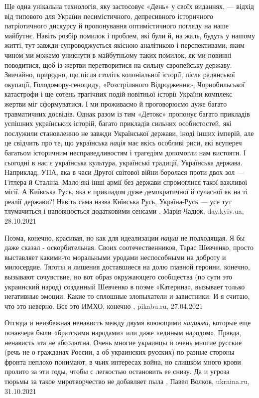 Ще одна унікальна технологія, яку застосовує «День» у своїх виданнях, — відхід
від типового для України песимістичного, депресивного історичного патріотичного
дискурсу й пропонування оптимістичного погляду на наше майбутнє. Навіть розбір
помилок і проблем, які були й, на жаль, будуть у нашому житті, тут завжди
супроводжується якісною аналітикою і перспективами, яким чином ми можемо
уникнути в майбутньому таких помилок, як ми повинні поводитися, щоб із жертви
перетворитися на сильну європейську державу. Звичайно, природно, що після
століть колоніальної історії, після радянської окупації, Голодомору-геноциду,
«Розстріляного Відродження», Чорнобильської катастрофи і ще сотень трагічних
подій новітньої історії України комплекс жертви міг сформуватися. І ми
проживаємо й проговорюємо дуже багато травматичних досвідів.  Однак разом із
тим «Детокс» пропонує багато прикладів успішних українських історій, багато
прикладів сильних особистостей, які послужили становленню не завжди Української
держави, іноді інших імперій, але це свідчить про те, що українська
\emph{нація} має якісь особливі риси, які всупереч багатьом історичним
несправедливостям і трагедіям допомогли нам вистояти. І сьогодні в нас є
українська культура, українські традиції, Українська держава. Наприклад, УПА,
яка в часи Другої світової війни боролася проти двох зол — Гітлера й Сталіна.
Мало які інші армії без держави спромоглися такої важливої місії. А Київська
Русь, яка є прикладом дуже демократичної й сучасної як на ті реалії держави?!
Навіть сама назва Київська Русь, Україна-Русь — усе тут тлумачиться і
наповнюється додатковими сенсами
, 
Марія Чадюк, day.kyiv.ua, 28.10.2021

Поэма, конечно, красивая, но как для идеализации \emph{нации} не подходящая. Я
бы даже сказал - оскорбительная. Своих соотечественников, Тарас Шевченко,
просто выставляет какими-то моральными уродами неспособными на доброту и
милосердие.  Тяготы и лишения доставшиеся на долю главной героини, конечно,
вызывают сочувствие, но вот образ окружающего сообщества (по сути это
украинский народ) созданный Шевченко в поэме «Катерина», вызывает только
негативные эмоции. Какие то сплошные злопыхатели и завистники. И я считаю, что
это неверно.  Все это ИМХО, конечно
, pikabu.ru, 27.04.2021

Отсюда и неизбежная ненависть между двумя воюющими \emph{нациями}, которые еще
позавчера были «братскими народами» или даже «единым народом». Правда,
ненависть эта не абсолютна. Очень многие украинцы и очень многие русские (речь
не о гражданах России, а об украинских русских) по разные стороны фронта
неплохо понимают, в чьих интересах война, но слишком много крови пролито за эти
годы, чтобы с легкостью остановить ее снизу. Да и угроза тюрьмы за такое
миротворчество не добавляет пыла
, Павел Волков, ukraina.ru, 31.10.2021

